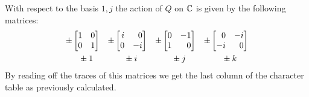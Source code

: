 \begin{example}
  With respect to the basis $1, j$ the action of $Q$ on $\mathbb{C}$ is given by the following matrices:
  \[
    \begin{array}{ccccc}
        \pm
        \begin{bmatrix*}[r]
          1 & 0 \\
          0 & 1
        \end{bmatrix*}
      & \pm
        \begin{bmatrix*}[r]
          i &  0  \\
          0 & -i
        \end{bmatrix*}
      & \pm
        \begin{bmatrix*}[r]
          0 & -1  \\
          1 &  0
        \end{bmatrix*}
      & \pm
        \begin{bmatrix*}[r]
           0  & -i \\
          -i  &  0
        \end{bmatrix*}
      \\
        \rule{0pt}{1.2em}
        \phantom{\pm}\pm 1
      & \phantom{\pm}\pm i
      & \phantom{\pm}\pm j
      & \phantom{\pm}\pm k
    \end{array}
  \]
  By reading off the traces of this matrices we get the last column of the character table as previously calculated.
\end{example}








